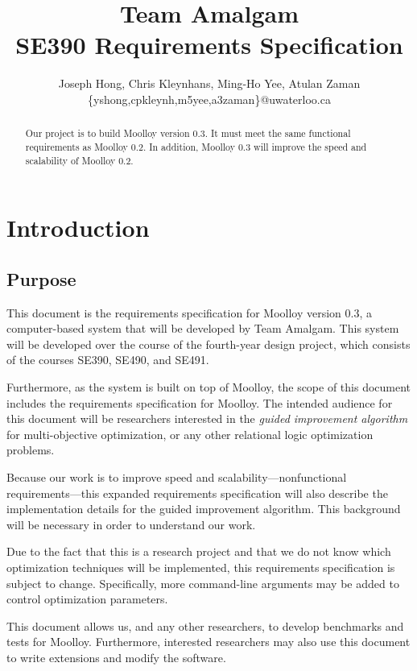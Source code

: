 \documentclass[11pt]{article}
\title{{\Large Team Amalgam} \\ SE390 Requirements Specification}
\author{Joseph Hong, Chris Kleynhans, Ming-Ho Yee, Atulan Zaman \\
        \{yshong,cpkleynh,m5yee,a3zaman\}@uwaterloo.ca}
\theoremstyle{definition}
\begin{document}
\maketitle

\begin{abstract}
Our project is to build Moolloy version 0.3. It must meet the same
functional requirements as Moolloy 0.2. In addition, Moolloy 0.3 will
improve the speed and scalability of Moolloy 0.2.
\end{abstract}

\tableofcontents
\newpage

\section{Introduction}\label{sec:intro}
\subsection{Purpose}\label{sec:purpose}

This document is the requirements specification for Moolloy version
0.3, a computer-based system that will be developed by Team Amalgam.
This system will be developed over the course of the fourth-year design
project, which consists of the courses SE390, SE490, and SE491.

Furthermore, as the system is built on top of Moolloy, the scope of
this document includes the requirements specification for Moolloy.
The intended audience for this document will be researchers interested
in the \textit{guided improvement algorithm} for multi-objective
optimization, or any other relational logic optimization problems.

Because our work is to improve speed and
scalability---nonfunctional requirements---this expanded requirements
specification will also describe the implementation details for the
guided improvement algorithm. This background will be necessary in
order to understand our work.

Due to the fact that this is a research project and that we do not know
which optimization techniques will be implemented, this requirements
specification is subject to change. Specifically, more command-line
arguments may be added to control optimization parameters.

This document allows us, and any other researchers, to develop
benchmarks and tests for Moolloy. Furthermore, interested researchers
may also use this document to write extensions and modify the software.
\end{document}
